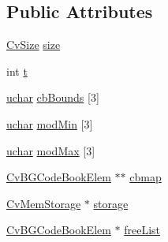 \subsection*{Public Attributes}
\begin{DoxyCompactItemize}
\item 
\hyperlink{structCvSize}{Cv\-Size} \hyperlink{structCvBGCodeBookModel_ac0189344d2ee3ea3a4d79b0179a49b9e}{size}
\item 
int \hyperlink{structCvBGCodeBookModel_a717a48bfd25d92aa1733ef8a94124949}{t}
\item 
\hyperlink{core_2types__c_8h_a65f85814a8290f9797005d3b28e7e5fc}{uchar} \hyperlink{structCvBGCodeBookModel_adbee5a1b1d5393fcf7d513c7f97f2601}{cb\-Bounds} \mbox{[}3\mbox{]}
\item 
\hyperlink{core_2types__c_8h_a65f85814a8290f9797005d3b28e7e5fc}{uchar} \hyperlink{structCvBGCodeBookModel_ab9474e810907e21b77f89a4ed63a4f97}{mod\-Min} \mbox{[}3\mbox{]}
\item 
\hyperlink{core_2types__c_8h_a65f85814a8290f9797005d3b28e7e5fc}{uchar} \hyperlink{structCvBGCodeBookModel_a4c1fb0cc7173bafb6e33a9965e28e9c0}{mod\-Max} \mbox{[}3\mbox{]}
\item 
\hyperlink{structCvBGCodeBookElem}{Cv\-B\-G\-Code\-Book\-Elem} $\ast$$\ast$ \hyperlink{structCvBGCodeBookModel_a82de70905b52c5d7efb91da173795a5e}{cbmap}
\item 
\hyperlink{structCvMemStorage}{Cv\-Mem\-Storage} $\ast$ \hyperlink{structCvBGCodeBookModel_af6dbfa6932fafbeeaf6e8f47f171f4ce}{storage}
\item 
\hyperlink{structCvBGCodeBookElem}{Cv\-B\-G\-Code\-Book\-Elem} $\ast$ \hyperlink{structCvBGCodeBookModel_ae52f0bf5e3ec04e00a73c4983c6839ec}{free\-List}
\end{DoxyCompactItemize}


